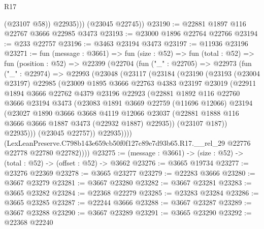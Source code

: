 \begin{lexlean}{R17}
\begin{coremodule}
              (@23107 @58))
            @22935)))
      (@23045 @22745))
@23190 := @22881 @1897 @116 @22767 @3666 @22985 @3473
@23193 := @23000 @1896 @22764 @22766
@23194 := @233 @22757
@23196 := @3463 @23194 @3473
@23197 := @11936 @23196
@23271 := fun (message : @3661) =>
  fun (size : @52) =>
  fun (total : @52) =>
  fun (position : @52) =>
  @22399
    (@22704
      (fun ("_" : @22705) =>
      @22973
        (fun ("_" : @22974) =>
        @22993
          (@23048
            (@23117
              (@23184
                (@23190
                  (@23193
                    (@23004 @23197)
                    @22985
                    (@23009
                      @1895
                      @3666
                      @22763
                      @4383
                      @23197
                      @23019
                      (@22911
                        @1894
                        @3666
                        @22762
                        @4379
                        @23196
                        @22923
                        (@22881
                          @1892
                          @116
                          @22760
                          @3666
                          @23194
                          @3473
                          (@23083
                            @1891
                            @3669
                            @22759
                            (@11696 @12066)
                            @23194
                            (@23027
                              @1890
                              @3666
                              @3668
                              @4119
                              @12066
                              @23037
                              (@22881 @1888 @116 @3666 @3666 @1887 @3473 (@22932 @1887) @22935))
                            (@23107 @187))
                          @22935)))
                    (@23045 @22757))
                  @22935))))
          (LexLeanPreserve.C798b143e659cb50f0f127c89e7d93b65.R17.__rel_29
            @22776
            @22778
            @22780
            @22782))))
@23275 := (message : @3661) -> (size : @52) -> (total : @52) -> (offset : @52) -> @3662
@23276 := @3665 @19734
@23277 := @23276 @22369
@23278 := @3665 @23277
@23279 := @22283 @3666
@23280 := @3667 @23279
@23281 := @3667 @23280
@23282 := @3667 @23281
@23283 := @3665 @23282
@23284 := @22368 @22279
@23285 := @23283 @23284
@23286 := @3665 @23285
@23287 := @22244 @3666
@23288 := @3667 @23287
@23289 := @3667 @23288
@23290 := @3667 @23289
@23291 := @3665 @23290
@23292 := @22368 @22240

\end{coremodule}
\end{lexlean}
